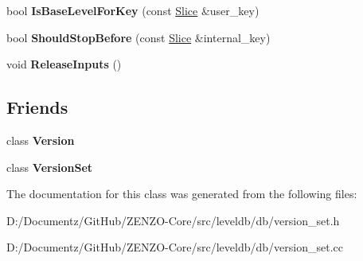 \begin{DoxyCompactItemize}
bool {\bfseries Is\+Base\+Level\+For\+Key} (const \mbox{\hyperlink{classleveldb_1_1_slice}{Slice}} \&user\+\_\+key)
\item 
\mbox{\label{classleveldb_1_1_compaction_a07624423bb512fedb358a008a38fa0b9}} 
bool {\bfseries Should\+Stop\+Before} (const \mbox{\hyperlink{classleveldb_1_1_slice}{Slice}} \&internal\+\_\+key)
\item 
\mbox{\label{classleveldb_1_1_compaction_a87ec90747d22dce0d103149db1ecf709}} 
void {\bfseries Release\+Inputs} ()
\end{DoxyCompactItemize}
\subsection*{Friends}
\begin{DoxyCompactItemize}
\item 
\mbox{\label{classleveldb_1_1_compaction_ace162f32d4abb584945d3a55a389b0a3}} 
class {\bfseries Version}
\item 
\mbox{\label{classleveldb_1_1_compaction_a1827cd1b4d6e9e3c378ce37ca3cce635}} 
class {\bfseries Version\+Set}
\end{DoxyCompactItemize}


The documentation for this class was generated from the following files\+:\begin{DoxyCompactItemize}
\item 
D\+:/\+Documentz/\+Git\+Hub/\+Z\+E\+N\+Z\+O-\/\+Core/src/leveldb/db/version\+\_\+set.\+h\item 
D\+:/\+Documentz/\+Git\+Hub/\+Z\+E\+N\+Z\+O-\/\+Core/src/leveldb/db/version\+\_\+set.\+cc\end{DoxyCompactItemize}
